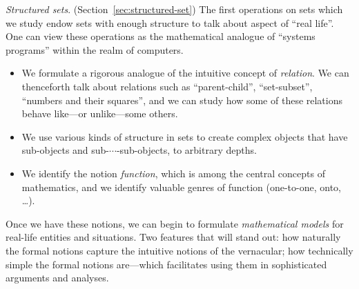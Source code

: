 {\it Structured sets}.  (Section~\ref{sec:structured-set}) The first operations on sets which we study endow sets with enough structure to talk about aspect of  ``real life''.  One can view these operations as the mathematical analogue of ``systems programs'' within the realm of computers.
\begin{itemize}
\item
We formulate a rigorous analogue of the intuitive concept of {\it relation}.  We can thenceforth talk about relations such as ``parent-child'', ``set-subset'', ``numbers and their squares'', and we can study how some of these relations behave like---or unlike---some others.
\item
We use various kinds of structure in sets to create complex objects that have sub-objects and sub-$\cdots$-sub-objects, to arbitrary depths.
\item
We identify the notion {\it function}, which is among the central concepts of mathematics, and we identify valuable genres of function (one-to-one, onto, \ldots).
\end{itemize}
Once we have these notions, we can begin to formulate {\it mathematical models} for real-life entities and situations.  Two features that will stand out: how naturally the formal notions capture the intuitive notions of the vernacular; how technically simple the formal notions are---which facilitates using them in sophisticated arguments and analyses.

\bigskip

